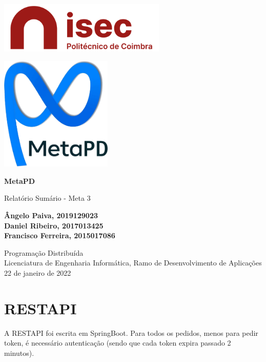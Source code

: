 \documentclass[11pt]{article}
\begin{document}
	\begin{titlepage}
		\begin{center}
			\includegraphics[width=0.6\textwidth]{logo-isec}
			
			\vspace*{\fill}
			
			\includegraphics[width=0.4\textwidth]{icon-metapd}
			
			\Huge
			\textbf{MetaPD}
			
			\huge
			Relatório Sumário - Meta 3
			
			\vspace{2cm}
			
			\Large
			\textbf{
				Ângelo Paiva, 2019129023 \\
				Daniel Ribeiro, 2017013425 \\
				Francisco Ferreira, 2015017086
			}
			
			\vfill
			\vspace*{\fill}
			
			\normalsize
			Programação Distribuída \\
			Licenciatura de Engenharia Informática, Ramo de Desenvolvimento de Aplicações \\
			22 de janeiro de 2022		
		\end{center}
	\end{titlepage}

	\tableofcontents
	\pagebreak
	
	\large
	\section{RESTAPI}
	\normalsize
	
	A RESTAPI foi escrita em SpringBoot. Para todos os pedidos, menos para pedir token, é necessário autenticação (sendo que cada token expira passado 2 minutos).
	
\end{document}
